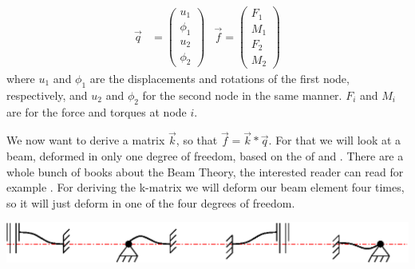 \begin{align}
\vec{q}&=\left(\begin{array}{c}
u_1 \\ 
\phi_1 \\ 
u_2 \\ 
\phi_2
\end{array} \right)&\vec{f}=\left(\begin{array}{c}
F_1 \\ 
M_1 \\ 
F_2 \\ 
M_2
\end{array}\right)\nonumber
\end{align}
where $u_1$ and $\phi_1$ are the displacements and rotations of the first node, respectively, and  $u_2$ and $\phi_2$ for the second node in the same manner. $F_i$ and $M_i$ are for the force and torques at node $i$.
\bigskip 

We now want to derive a matrix $\vec{k}$, so that $\vec{f}=\vec{k}*\vec{q}$. For that we will look at a beam, deformed in only one degree of freedom, based on the  of  and . There are a whole bunch of books about the Beam Theory, the interested reader can read for example \cite{timoschenko}. For deriving the k-matrix we will deform our beam element four times, so it will just deform in one of the four degrees of freedom.\\
\bigskip
\begin{center}
\includegraphics[scale=1.2]{fourDeformations}
\end{center}
\bigskip 

